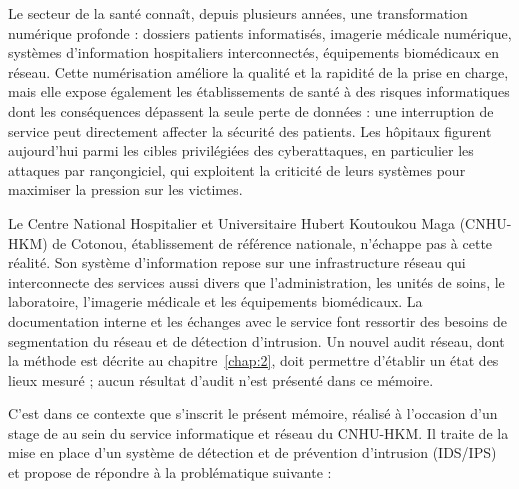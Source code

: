 \introduction

Le secteur de la santé connaît, depuis plusieurs années, une transformation numérique profonde : dossiers patients informatisés, imagerie médicale numérique, systèmes d'information hospitaliers interconnectés, équipements biomédicaux en réseau. Cette numérisation améliore la qualité et la rapidité de la prise en charge, mais elle expose également les établissements de santé à des risques informatiques dont les conséquences dépassent la seule perte de données : une interruption de service peut directement affecter la sécurité des patients. Les hôpitaux figurent aujourd'hui parmi les cibles privilégiées des cyberattaques, en particulier les attaques par rançongiciel, qui exploitent la criticité de leurs systèmes pour maximiser la pression sur les victimes.

Le Centre National Hospitalier et Universitaire Hubert Koutoukou Maga (CNHU-HKM) de Cotonou, établissement de référence nationale\cite{decret2015}, n'échappe pas à cette réalité. Son système d'information repose sur une infrastructure réseau qui interconnecte des services aussi divers que l'administration, les unités de soins, le laboratoire, l'imagerie médicale et les équipements biomédicaux. La documentation interne et les échanges avec le service font ressortir des besoins de segmentation du réseau et de détection d'intrusion. Un nouvel audit réseau, dont la méthode est décrite au chapitre~\ref{chap:2}, doit permettre d'établir un état des lieux mesuré ; aucun résultat d'audit n'est présenté dans ce mémoire.

C'est dans ce contexte que s'inscrit le présent mémoire, réalisé à l'occasion d'un stage de  au sein du service informatique et réseau du CNHU-HKM. Il traite de la mise en place d'un système de détection et de prévention d'intrusion (IDS/IPS) et propose de répondre à la problématique suivante :


